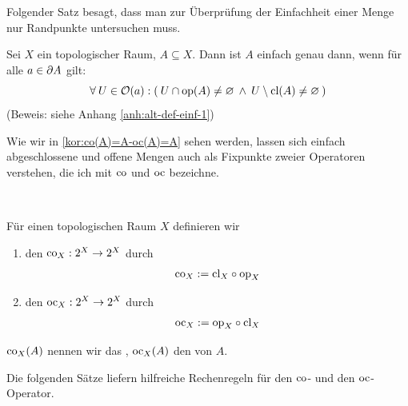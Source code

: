 %
%
    Folgender Satz besagt, dass man zur Überprüfung der Einfachheit einer Menge nur Randpunkte untersuchen muss. 
    \begin{satz}\label{satz:alt-def-einf-1}
        Sei $X$ ein topologischer Raum, $A \subseteq X$. Dann ist $A$ einfach genau dann, wenn für alle $a \in \partial A$ gilt:
        $$\forall\: U \in \mathcal{O}(a): (\: U \cap \text{op}(A) \neq \varnothing \:\land\: U \setminus \text{cl}(A) \neq \varnothing \:) $$
        (Beweis: siehe Anhang \ref{anh:alt-def-einf-1})
    \end{satz}
%
%   
    Wie
    wir in \ref{kor:co(A)=A-oc(A)=A} sehen werden, lassen sich einfach abgeschlossene und offene Mengen auch als Fixpunkte zweier Operatoren verstehen, die ich mit $\text{co}$ und $\text{oc}$ bezeichne.
%
    \begin{dfn}\label{def:cooc} \ \vspace{8pt}

        \noindent
        Für einen topologischen Raum $X$ definieren wir
        \begin{enumerate}
            \item den  $\text{co}_X: 2^X \rightarrow 2^X$ durch
                \begin{align*}
                    \text{co}_X := \text{cl}_X \circ \text{op}_X 		
                \end{align*} 
            \item den  $\text{oc}_X: 2^X \rightarrow 2^X$ durch
                \begin{align*}
                    \text{oc}_X := \text{op}_X \circ \text{cl}_X 		
                \end{align*} 	
        \end{enumerate}	 

        \noindent
        $\text{co}_X(A)$ nennen wir das , $\text{oc}_X(A)$ den  von $A$.
        
    \end{dfn}
%
%
    Die folgenden Sätze liefern hilfreiche Rechenregeln für den $\text{co}$- und den $\text{oc}$-Operator.
%
